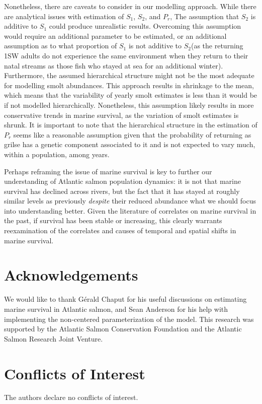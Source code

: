 \documentclass[12pt]{article}
\newcommand{\So}{$S_{1}$\xspace}
\newcommand{\St}{$S_{2}$\xspace}
\newcommand{\Pg}{$P_r$\xspace}
\begin{document}
Nonetheless, there are caveats to consider in our modelling approach.
While there are analytical issues with estimation of \So, \St, and \Pg,
The assumption that \St is additive to \So could produce unrealistic results.
Overcoming this assumption would require an additional parameter to be
estimated, or an additional assumption as to what proportion of \So is not
additive to \St (as the returning 1SW adults do not experience the same
environment when they return to their natal streams as those fish who stayed
at sea for an additional winter).
Furthermore, the assumed hierarchical structure might not be the most adequate
for modelling smolt abundances. This approach results in shrinkage to the
mean, which means that the variability of yearly smolt estimates is less than
it would be if not modelled hierarchically. Nonetheless, this assumption
likely results in more conservative trends in marine survival, as the
variation of smolt estimates is shrunk.
It is important to note that the hierarchical structure in the estimation of
\Pg seems like a reasonable assumption given that the probability of returning
as grilse has a genetic component associated to it \citep{Aykanat2019} and is
not expected to vary much, within a population, among years.

Perhaps reframing the issue of marine survival is key to further our
understanding of Atlantic salmon population dynamics: it is not that marine
survival has declined across rivers, but the fact that it has stayed at
roughly similar levels as previously \emph{despite} their reduced abundance
what we should focus into understanding better.
Given the literature of correlates on marine survival in the past, if survival
has been stable or increasing, this clearly warrants reexamination of the
correlates and causes of temporal and spatial shifts in marine survival.



\section*{Acknowledgements}

We would like to thank G\'{e}rald Chaput for his useful discussions on
estimating marine survival in Atlantic salmon, and Sean Anderson for his help
with implementing the non-centered parameterization of the model.
This research was supported by the Atlantic Salmon Conservation Foundation and
the Atlantic Salmon Research Joint Venture.

\section*{Conflicts of Interest}

The authors declare no conflicts of interest.
 


%
\end{document}
